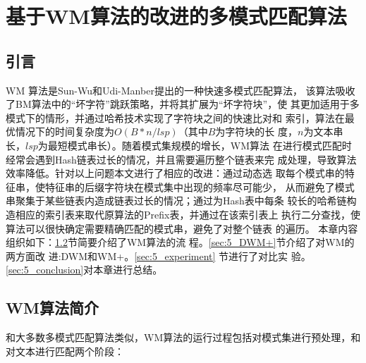 \chapter{基于WM算法的改进的多模式匹配算法}
\label{chap:WM}

\section{引言}
\label{sec:5_introduction}

WM \cite{Wu1994} 算法是Sun-Wu和Udi-Manber提出的一种快速多模式匹配算法，
该算法吸收了BM算法中的“坏字符”跳跃策略，并将其扩展为“坏字符块”，使
其更加适用于多模式下的情形，并通过哈希技术实现了字符块之间的快速比对和
索引，算法在最优情况下的时间复杂度为$O(B*n/lsp)$（其中$B$为字符块的长
度，$n$为文本串长，$lsp$为最短模式串长）。随着模式集规模的增长，WM算法
在进行模式匹配时经常会遇到Hash链表过长的情况，并且需要遍历整个链表来完
成处理，导致算法效率降低。针对以上问题本文进行了相应的改进：通过动态选
取每个模式串的特征串，使特征串的后缀字符块在模式集中出现的频率尽可能少，
从而避免了模式串聚集于某些链表内造成链表过长的情况；通过为Hash表中每条
较长的哈希链构造相应的索引表来取代原算法的Prefix表，并通过在该索引表上
执行二分查找，使算法可以很快确定需要精确匹配的模式串，避免了对整个链表
的遍历。 本章内容组织如下：\ref{sec:5_WM}节简要介绍了WM算法的流
程。\ref{sec:5_DWM+}节介绍了对WM的两方面改
进:DWM和WM+。\ref{sec:5_experiment} 节进行了对比实
验。\ref{sec:5_conclusion}对本章进行总结。


\section{WM算法简介}
\label{sec:5_WM}

和大多数多模式匹配算法类似，WM算法的运行过程包括对模式集进行预处理，和
对文本进行匹配两个阶段：

